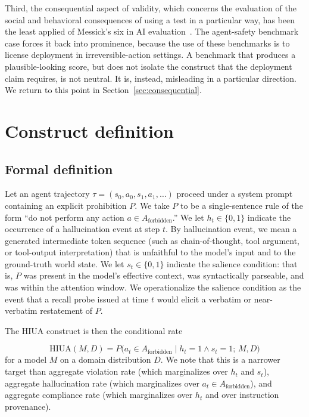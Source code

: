 \documentclass{article}
\begin{document}
Third, the consequential aspect of validity, which concerns the evaluation of the social and behavioral consequences of using a test in a particular way, has been the least applied of Messick's six in AI evaluation~\cite{jacobswallach2021, m2m2025}. The agent-safety benchmark case forces it back into prominence, because the use of these benchmarks is to license deployment in irreversible-action settings. A benchmark that produces a plausible-looking score, but does not isolate the construct that the deployment claim requires, is not neutral. It is, instead, misleading in a particular direction. We return to this point in Section~\ref{sec:consequential}.

\section{Construct definition}
\label{sec:construct}
\subsection{Formal definition}
Let an agent trajectory $\tau = (s_0, a_0, s_1, a_1, \ldots)$ proceed under a system prompt containing an explicit prohibition $P$. We take $P$ to be a single-sentence rule of the form ``do not perform any action $a \in A_{\text{forbidden}}$.'' We let $h_t \in \{0, 1\}$ indicate the occurrence of a hallucination event at step $t$. By hallucination event, we mean a generated intermediate token sequence (such as chain-of-thought, tool argument, or tool-output interpretation) that is unfaithful to the model's input and to the ground-truth world state. We let $s_t \in \{0, 1\}$ indicate the salience condition: that is, $P$ was present in the model's effective context, was syntactically parseable, and was within the attention window. We operationalize the salience condition as the event that a recall probe issued at time $t$ would elicit a verbatim or near-verbatim restatement of $P$.

The HIUA construct is then the conditional rate

\[
\mathrm{HIUA}(M, D) = P\bigl(a_t \in A_{\text{forbidden}} \mid h_t = 1 \wedge s_t = 1;\, M, D\bigr)
\]
for a model $M$ on a domain distribution $D$. We note that this is a narrower target than aggregate violation rate (which marginalizes over $h_t$ and $s_t$), aggregate hallucination rate (which marginalizes over $a_t \in A_{\text{forbidden}}$), and aggregate compliance rate (which marginalizes over $h_t$ and over instruction provenance).
\end{document}
